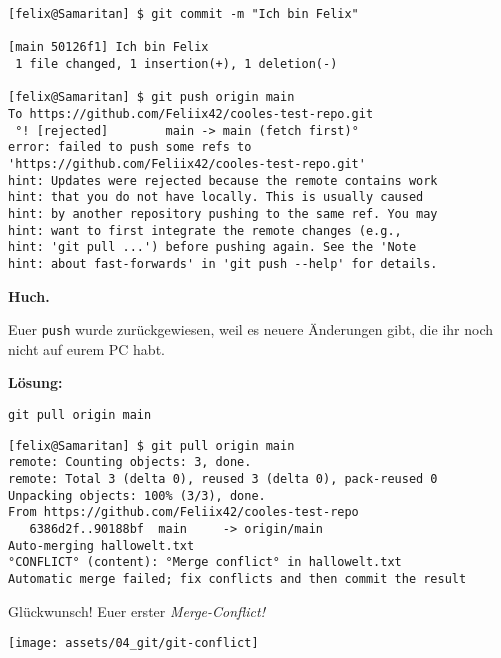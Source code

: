 \begin{frame}[fragile]
	\begin{lstlisting}
[felix@Samaritan] $ git commit -m "Ich bin Felix"

[main 50126f1] Ich bin Felix
 1 file changed, 1 insertion(+), 1 deletion(-)

[felix@Samaritan] $ git push origin main
To https://github.com/Feliix42/cooles-test-repo.git
 °! [rejected]        main -> main (fetch first)°
error: failed to push some refs to 'https://github.com/Feliix42/cooles-test-repo.git'
hint: Updates were rejected because the remote contains work
hint: that you do not have locally. This is usually caused
hint: by another repository pushing to the same ref. You may
hint: want to first integrate the remote changes (e.g.,
hint: 'git pull ...') before pushing again. See the 'Note
hint: about fast-forwards' in 'git push --help' for details.
\end{lstlisting}
\begin{center}\textbf{Huch.}\end{center}
\end{frame}

\begin{frame}
	\centering Euer \texttt{push} wurde zurückgewiesen, weil es neuere Änderungen gibt, die ihr noch nicht auf eurem PC habt.
	\vfill

	\textbf{Lösung:}
	
	\texttt{git pull origin main}
\end{frame}

\begin{frame}[fragile]
	\begin{lstlisting}
[felix@Samaritan] $ git pull origin main
remote: Counting objects: 3, done.
remote: Total 3 (delta 0), reused 3 (delta 0), pack-reused 0
Unpacking objects: 100% (3/3), done.
From https://github.com/Feliix42/cooles-test-repo
   6386d2f..90188bf  main     -> origin/main
Auto-merging hallowelt.txt
°CONFLICT° (content): °Merge conflict° in hallowelt.txt
Automatic merge failed; fix conflicts and then commit the result
\end{lstlisting}

\pause{}
\begin{center} \textbf{} Glückwunsch! Euer erster \emph{Merge-Conflict!} \end{center}
\end{frame}

\begin{frame}
	\centering \texttt{[image: assets/04\_git/git-conflict]}
\end{frame}

